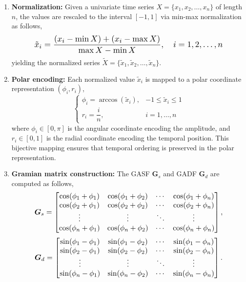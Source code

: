 \documentclass[twocolumn,iicol,pdflatex,sn-mathphys-num]{sn-jnl}%
\begin{document}
\begin{enumerate}
	\item \textbf{Normalization:} Given a univariate time series $X = \{x_1, x_2, \ldots, x_n\}$ of length $n$, the values are rescaled to the interval $[-1, 1]$ via min-max normalization as follows,
	\begin{equation}
		\resizebox{0.8\columnwidth}{!}{$\tilde{x}_i = \dfrac{(x_i - \min X) + (x_i - \max X)}{\max X - \min X}, \quad i = 1, 2, \ldots, n$}
	\end{equation}
	yielding the normalized series $\tilde{X} = \{\tilde{x}_1, \tilde{x}_2, \ldots, \tilde{x}_n\}$.
	
	\item \textbf{Polar encoding:} Each normalized value $\tilde{x}_i$ is mapped to a polar coordinate representation $(\phi_i, r_i)$,
	\begin{equation}
		\begin{cases} 
			\phi_i = \arccos(\tilde{x}_i), & -1 \leq \tilde{x}_i \leq 1 \\[4pt]
			r_i = \dfrac{i}{n}, & i = 1, \ldots, n 
		\end{cases}
	\end{equation}
	where $\phi_i \in [0, \pi]$ is the angular coordinate encoding the amplitude, and $r_i \in [0, 1]$ is the radial coordinate encoding the temporal position. This bijective mapping ensures that temporal ordering is preserved in the polar representation.
	
	\item \textbf{Gramian matrix construction:} The GASF $\bm{G}_s$ and GADF $\bm{G}_d$ are computed as follows,
	\begin{equation}
		\resizebox{0.8\columnwidth}{!}{$\bm{G}_s = \begin{bmatrix}
			\cos(\phi_1 + \phi_1) & \cos(\phi_1 + \phi_2) & \cdots & \cos(\phi_1 + \phi_n) \\
			\cos(\phi_2 + \phi_1) & \cos(\phi_2 + \phi_2) & \cdots & \cos(\phi_2 + \phi_n) \\
			\vdots & \vdots & \ddots & \vdots \\
			\cos(\phi_n + \phi_1) & \cos(\phi_n + \phi_2) & \cdots & \cos(\phi_n + \phi_n)
		\end{bmatrix},$}
	\end{equation}
	\begin{equation}
		\resizebox{0.8\columnwidth}{!}{$\bm{G}_d = \begin{bmatrix}
			\sin(\phi_1 - \phi_1) & \sin(\phi_1 - \phi_2) & \cdots & \sin(\phi_1 - \phi_n) \\
			\sin(\phi_2 - \phi_1) & \sin(\phi_2 - \phi_2) & \cdots & \sin(\phi_2 - \phi_n) \\
			\vdots & \vdots & \ddots & \vdots \\
			\sin(\phi_n - \phi_1) & \sin(\phi_n - \phi_2) & \cdots & \sin(\phi_n - \phi_n)
		\end{bmatrix}.$}
	\end{equation}
\end{enumerate}
\end{document}
